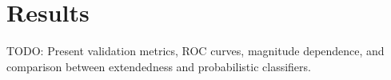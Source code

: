 \section{Results}

TODO: Present validation metrics, ROC curves, magnitude dependence, and comparison between extendedness and probabilistic classifiers.
